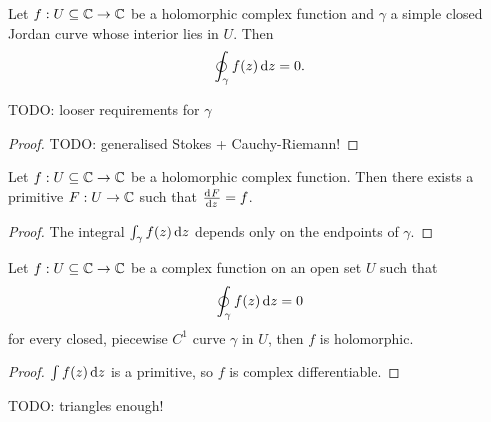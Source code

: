 \begin{theorem} \label{CauchyTheorem}
Let $f: U\subseteq \mathbb{C} \to \mathbb{C}$ be a holomorphic complex function and $\gamma$ a simple closed Jordan curve whose interior lies in $U$. Then
\[ \oint_\gamma f(z)\operatorname{d \!}{z} = 0. \]
\end{theorem}
TODO: looser requirements for $\gamma$
\begin{proof}
TODO: generalised Stokes + Cauchy-Riemann!
\end{proof}
\begin{corollary}
Let $f: U\subseteq \mathbb{C} \to \mathbb{C}$ be a holomorphic complex function. Then there exists a primitive $F: U\to \mathbb{C}$ such that $\od{F}{z} = f$.
\end{corollary}
\begin{proof}
The integral $\int_\gamma f(z)\operatorname{d \!}{z}$ depends only on the endpoints of $\gamma$.
\end{proof}

\begin{theorem}
Let $f: U\subseteq \mathbb{C} \to \mathbb{C}$ be a complex function on an open set $U$ such that
\[ \oint_\gamma f(z) \operatorname{d \!}{z} = 0 \]
for every closed, piecewise $C^1$ curve $\gamma$ in $U$, then $f$ is holomorphic.
\end{theorem}
\begin{proof}
$\int f(z)\operatorname{d \!}{z}$ is a primitive, so $f$ is complex differentiable.
\end{proof}
TODO: triangles enough!

